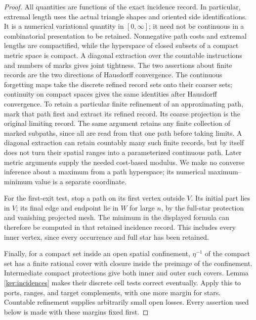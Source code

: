 \begin{proof}
All quantities are functions of the exact incidence record.  In
particular, extremal length uses the actual triangle shapes and
oriented side identifications.  It is a numerical variational
quantity in \([0,\infty]\); it need not be continuous in a combinatorial
presentation to be retained.  Nonnegative path costs and extremal
lengths are compactified, while the hyperspace of closed subsets of
a compact metric space is compact.  A diagonal extraction over the
countable instructions and numbers of marks gives joint tightness.
The two assertions about finite records are the two directions of
Hausdorff convergence.  The continuous forgetting maps take the
discrete refined record sets onto their coarser sets; continuity on
compact spaces gives the same identities after Hausdorff convergence.
To retain a particular finite refinement of an approximating path,
mark that path first and extract its refined record.  Its coarse
projection is the original limiting record.  The same argument
retains any finite collection of marked subpaths, since all are
read from that one path before taking limits.  A diagonal extraction
can retain countably many such finite records, but by itself does
not turn their spatial ranges into a parameterized continuous path.
Later metric arguments supply the needed cost-based modulus.
We make no converse inference about a maximum from a path hyperspace;
its numerical maximum--minimum value is a separate coordinate.

For the first-exit test, stop a path on its first vertex outside
\(V\).  Its initial part lies in \(V\); its final edge and endpoint
lie in \(W\) for large \(n\), by the full-star protection and vanishing
projected mesh.  The minimum in the displayed formula can therefore
be computed in that retained incidence record.  This includes every
inner vertex, since every occurrence and full star has been retained.

Finally, for a compact set inside an open spatial confinement,
\(\eta^{-1}\) of the compact set has a finite rational cover with
closure inside the preimage of the confinement.  Intermediate compact
protections give both inner and outer such covers.  Lemma
\ref{ker:incidences} makes their discrete cell tests correct eventually.
Apply this to ports, ranges, and target complements, with one more
margin for stars.  Countable refinement supplies arbitrarily small
open losses.  Every assertion used below is made with these margins
fixed first.
\end{proof}
